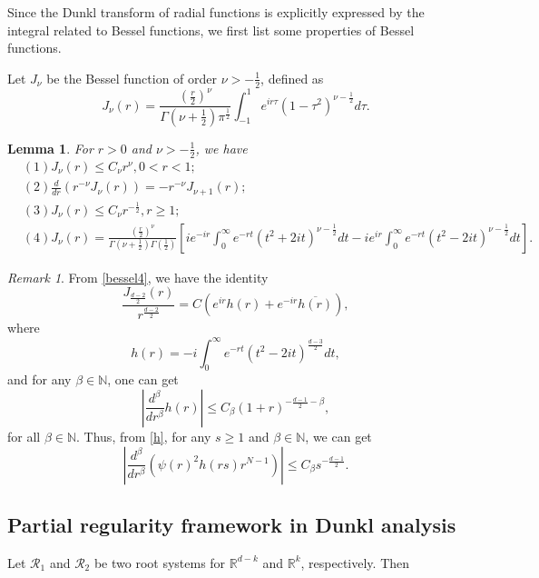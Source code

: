 \documentclass[a4paper,11pt, reqno]{amsart}
\newtheorem{lem}[theorem]{Lemma}
\theoremstyle{definition}
\theoremstyle{remark}
\newtheorem{rem}[theorem]{Remark}
\numberwithin{equation}{section}
\begin{document}
	Since the Dunkl transform of radial functions is explicitly expressed by the integral related to Bessel functions, we first list some properties of Bessel functions.
	
	Let $J_\nu$ be the Bessel function of order $\nu>-\frac{1}{2}$, defined as
	\begin{equation*}
		J_\nu(r)=\frac{(\frac{r}{2})^\nu}{\Gamma(\nu+\frac{1}{2})\pi^{\frac{1}{2}}}\int_{-1}^1e^{ir\tau}(1-\tau^2)^{\nu-\frac{1}{2}}d\tau.
	\end{equation*}
	
	\begin{lem}\cite{LMS}\label{Bessel}
		For $r>0$ and $\nu>-\frac{1}{2}$, we have
		\begin{align}
			&(1)J_\nu(r)\leq C_\nu r^\nu,0<r<1;\label{bessel1}\\
			&(2)\frac{d}{dr}\left(r^{-\nu}J_\nu(r)\right)=-r^{-\nu}J_{\nu+1}(r);\label{bessel2}\\
			&(3)J_\nu(r)\leq C_\nu r^{-\frac{1}{2}}, r\geq1;\label{bessel3}\\
			&(4)J_\nu(r)=\frac{(\frac{r}{2})^\nu}{\Gamma(\nu+\frac{1}{2})\Gamma(\frac{1}{2})} \left[ie^{-ir}\int_0^\infty e^{-rt}(t^2+2it)^{\nu-\frac{1}{2}}dt-ie^{ir}\int_0^\infty e^{-rt}(t^2-2it)^{\nu-\frac{1}{2}}dt\right].\label{bessel4}
		\end{align}
	\end{lem}
	\begin{rem}
		From \eqref{bessel4}, we have the identity
		\begin{equation}\label{Bessel-Fourier}
			\frac{J_{\frac{d-2}{2}}(r)}{r^\frac{d-2}{2}}=C\left(e^{ir}h(r)+e^{-ir}\overline{h(r)}\right),
		\end{equation}
		where $$h(r)=-i\int_0^\infty e^{-rt}(t^2-2it)^\frac{d-3}{2}dt,$$
		and  for any $\beta\in\mathbb{N}$, one can get     
		\begin{equation}\label{h}
			\left|\frac{d^\beta}{dr^\beta}h(r)\right|\leq C_\beta(1+r)^{-\frac{d-1}{2}-\beta},
		\end{equation}
		for all $\beta\in\mathbb{N}$. Thus, from \eqref{h}, for any $s\geq1$ and $\beta\in\mathbb{N}$, we can get 
		\begin{equation}\label{big-s}
			\left|\frac{d^\beta}{dr^\beta}\left(\psi(r)^2h(rs) r^{N-1}\right)\right|\leq C_\beta s^{-\frac{d-1}{2}}.
		\end{equation}
	\end{rem}
 

    
	\subsection{Partial regularity framework in Dunkl  analysis}
	Let  $\mathcal{R}_1$ and $\mathcal{R}_2$ be two root systems for   $\mathbb{R}^{d-k}$ and   $\mathbb{R}^k$,  respectively.  Then
	
\end{document}
